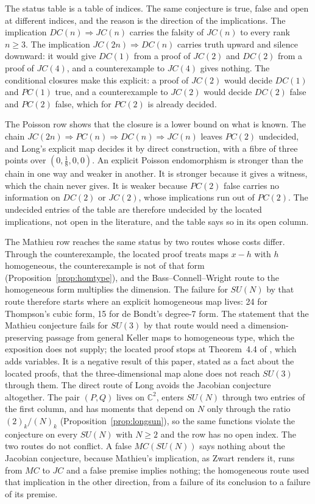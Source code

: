 \documentclass[11pt]{article}
\theoremstyle{remark}
\newcommand{\C}{\mathbb{C}}
\begin{document}
The status table is a table of indices. The same conjecture is true, false and open at different indices, and the reason is the direction of the implications. The implication $DC(n)\Rightarrow JC(n)$ carries the falsity of $JC(n)$ to every rank $n\ge3$. The implication $JC(2n)\Rightarrow DC(n)$ carries truth upward and silence downward: it would give $DC(1)$ from a proof of $JC(2)$ and $DC(2)$ from a proof of $JC(4)$, and a counterexample to $JC(4)$ gives nothing. The conditional closures make this explicit: a proof of $JC(2)$ would decide $DC(1)$ and $PC(1)$ true, and a counterexample to $JC(2)$ would decide $DC(2)$ false and $PC(2)$ false, which for $PC(2)$ is already decided.

The Poisson row shows that the closure is a lower bound on what is known. The chain $JC(2n)\Rightarrow PC(n)\Rightarrow DC(n)\Rightarrow JC(n)$ leaves $PC(2)$ undecided, and Long's explicit map decides it by direct construction, with a fibre of three points over $(0,\tfrac18,0,0)$. An explicit Poisson endomorphism is stronger than the chain in one way and weaker in another. It is stronger because it gives a witness, which the chain never gives. It is weaker because $PC(2)$ false carries no information on $DC(2)$ or $JC(2)$, whose implications run out of $PC(2)$. The undecided entries of the table are therefore undecided by the located implications, not open in the literature, and the table says so in its open column.

The Mathieu row reaches the same status by two routes whose costs differ. Through the counterexample, the located proof treats maps $x-h$ with $h$ homogeneous, the counterexample is not of that form (Proposition~\ref{prop:homtype}), and the Bass--Connell--Wright route to the homogeneous form multiplies the dimension. The failure for $SU(N)$ by that route therefore starts where an explicit homogeneous map lives: 24 for Thompson's cubic form, 15 for de Bondt's degree-7 form. The statement that the Mathieu conjecture fails for $SU(3)$ by that route would need a dimension-preserving passage from general Keller maps to homogeneous type, which the exposition does not supply; the located proof stops at Theorem~4.4 of \cite[p.~34]{Zwart2025}, which adds variables. It is a negative result of this paper, stated as a fact about the located proofs, that the three-dimensional map alone does not reach $SU(3)$ through them. The direct route of Long avoids the Jacobian conjecture altogether. The pair $(P,Q)$ lives on $\C^2$, enters $SU(N)$ through two entries of the first column, and has moments that depend on $N$ only through the ratio $(2)_k/(N)_k$ (Proposition~\ref{prop:longsun}), so the same functions violate the conjecture on every $SU(N)$ with $N\ge2$ and the row has no open index. The two routes do not conflict. A false $MC(SU(N))$ says nothing about the Jacobian conjecture, because Mathieu's implication, as Zwart renders it, runs from $MC$ to $JC$ and a false premise implies nothing; the homogeneous route used that implication in the other direction, from a failure of its conclusion to a failure of its premise.
\end{document}
